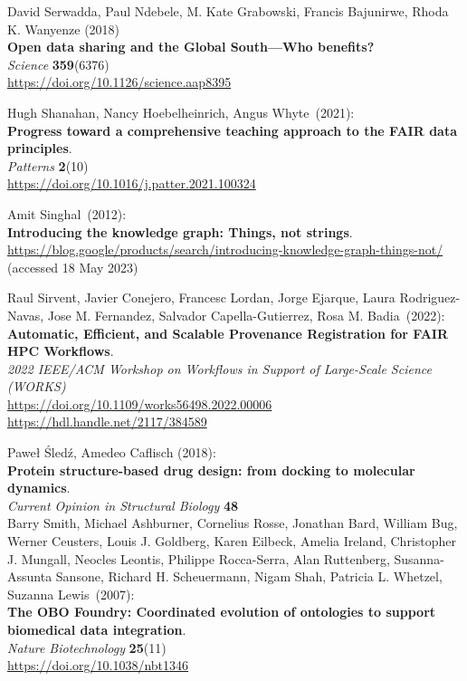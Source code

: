 \begin{thebibliography}{9}
David Serwadda, Paul Ndebele, M. Kate Grabowski, Francis Bajunirwe, Rhoda K. Wanyenze (2018) \\
\textbf{Open data sharing and the Global South—Who benefits?} \\
\emph{Science} \textbf{359}(6376) \\
\url{https://doi.org/10.1126/science.aap8395}

Hugh Shanahan, Nancy Hoebelheinrich, Angus Whyte~(2021):\\
\textbf{Progress toward a comprehensive teaching approach to the FAIR data principles}.\\
\emph{Patterns} \textbf{2}(10) \\
\url{https://doi.org/10.1016/j.patter.2021.100324}

Amit Singhal~(2012): \\
\textbf{Introducing the knowledge graph: Things, not strings}.\\
\url{https://blog.google/products/search/introducing-knowledge-graph-things-not/}
(accessed 18 May 2023)

Raul Sirvent, Javier Conejero, Francesc Lordan, Jorge Ejarque, Laura Rodriguez-Navas, Jose M. Fernandez, Salvador Capella-Gutierrez, Rosa M. Badia~(2022): \\
\textbf{Automatic, Efficient, and Scalable Provenance Registration for FAIR HPC Workflows}.\\
\emph{2022 IEEE/ACM Workshop on Workflows in Support of Large-Scale Science (WORKS)}\\
\url{https://doi.org/10.1109/works56498.2022.00006}\\
\url{https://hdl.handle.net/2117/384589}

Paweł Śledź, Amedeo Caflisch (2018):\\
\textbf{Protein structure-based drug design: from docking to molecular dynamics}.\\
\emph{Current Opinion in Structural Biology} \textbf{48} \\

Barry Smith, Michael Ashburner, Cornelius Rosse, Jonathan Bard, William Bug, Werner Ceusters, Louis J. Goldberg, Karen Eilbeck, Amelia Ireland, Christopher J. Mungall, Neocles Leontis, Philippe Rocca-Serra, Alan Ruttenberg, Susanna-Assunta Sansone, Richard H. Scheuermann, Nigam Shah, Patricia L. Whetzel, Suzanna Lewis~(2007): \\
\textbf{The {OBO Foundry}:
Coordinated evolution of ontologies to support biomedical data
integration}. \\
\emph{Nature Biotechnology} \textbf{25}(11) \\
\url{https://doi.org/10.1038/nbt1346}


\end{thebibliography}
